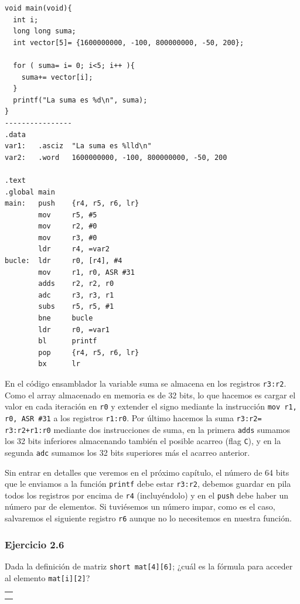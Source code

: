 \begin{lstlisting}
void main(void){
  int i;
  long long suma;
  int vector[5]= {1600000000, -100, 800000000, -50, 200};

  for ( suma= i= 0; i<5; i++ ){
    suma+= vector[i];
  }
  printf("La suma es %d\n", suma);
}
----------------
.data
var1:   .asciz  "La suma es %lld\n"
var2:   .word   1600000000, -100, 800000000, -50, 200

.text
.global main
main:   push    {r4, r5, r6, lr}
        mov     r5, #5
        mov     r2, #0
        mov     r3, #0
        ldr     r4, =var2
bucle:  ldr     r0, [r4], #4
        mov     r1, r0, ASR #31
        adds    r2, r2, r0
        adc     r3, r3, r1
        subs    r5, r5, #1
        bne     bucle
        ldr     r0, =var1
        bl      printf
        pop     {r4, r5, r6, lr}
        bx      lr
\end{lstlisting}

En el código ensamblador la variable suma se almacena en los registros {\tt r3:r2}.
Como el array almacenado en memoria es de 32 bits, lo que hacemos es cargar el valor
en cada iteración en {\tt r0} y extender el signo mediante la instrucción
{\tt mov r1, r0, ASR \#31} a los registros {\tt r1:r0}. Por último hacemos la suma
{\tt r3:r2= r3:r2+r1:r0} mediante dos instrucciones de suma, en la primera {\tt adds}
sumamos los 32 bits inferiores almacenando también el posible acarreo (flag {\tt C}),
y en la segunda {\tt adc} sumamos los 32 bits superiores más el acarreo anterior.

Sin entrar en detalles que veremos en el próximo capítulo, el número de 64 bits que
le enviamos a la función {\tt printf} debe estar {\tt r3:r2}, debemos guardar en pila
todos los registros por encima de {\tt r4} (incluyéndolo) y en el {\tt push} debe
haber un número par de elementos. Si tuviésemos un número impar, como es el caso,
salvaremos el siguiente registro {\tt r6} aunque no lo necesitemos en nuestra función.



\subsubsection{Ejercicio 2.6}
Dada la definición de matriz {\tt short mat[4][6]}; ¿cuál es la
fórmula para acceder al elemento {\tt mat[i][2]}?

\begin{center}
\colorbox[gray]{0.9}{
\small
\begin{tabular}{c}
\\
\begin{minipage}{0.9\linewidth}
\colorbox[gray]{1}{\rule{0cm}{0.6cm}\rule{11cm}{0cm}}\\
\end{minipage} \\
\end{tabular}
\vspace{0.5ex}
}
\end{center}


